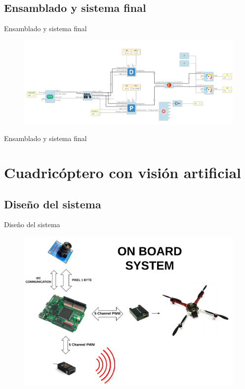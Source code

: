 \documentclass{beamer}
\begin{document}
\subsection{Ensamblado y sistema final}
\begin{frame}{Ensamblado y sistema final}
	\begin{figure}[H]
		\center
		\includegraphics[scale=0.3, angle=0]{imagenes/Balancing_robot/finalIceStudio}
	\end{figure}
\end{frame}

\begin{frame}{Ensamblado y sistema final}

\end{frame}
\section{Cuadricóptero con visión artificial}

\subsection{Diseño del sistema}

\begin{frame}{Diseño del sistema}
\begin{figure}[H]
	\center
	\includegraphics[trim = 0mm 0.5cm 0mm 0.5cm, clip,scale=0.38]{imagenes/Cuadricoptero_vision/on_board.pdf}
\end{figure}
\end{frame}
\end{document}
